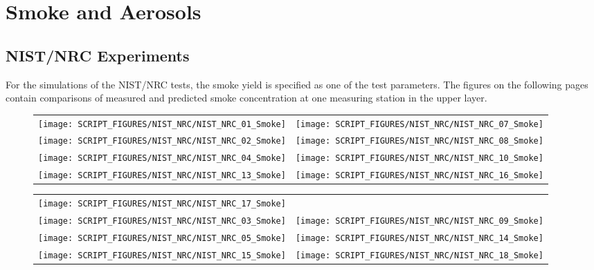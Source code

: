\clearpage


\section{Smoke and Aerosols}



\subsection{NIST/NRC Experiments}
\label{Smoke Concentration}

For the simulations of the NIST/NRC tests, the smoke yield is specified as one of the test parameters.
The figures on the following pages contain comparisons of measured and predicted smoke concentration at one measuring station in the upper layer.

\begin{figure}[p]
\begin{tabular*}{\textwidth}{l@{\extracolsep{\fill}}r}
\texttt{[image: SCRIPT\_FIGURES/NIST\_NRC/NIST\_NRC\_01\_Smoke]} &
\texttt{[image: SCRIPT\_FIGURES/NIST\_NRC/NIST\_NRC\_07\_Smoke]} \\
\texttt{[image: SCRIPT\_FIGURES/NIST\_NRC/NIST\_NRC\_02\_Smoke]} &
\texttt{[image: SCRIPT\_FIGURES/NIST\_NRC/NIST\_NRC\_08\_Smoke]} \\
\texttt{[image: SCRIPT\_FIGURES/NIST\_NRC/NIST\_NRC\_04\_Smoke]} &
\texttt{[image: SCRIPT\_FIGURES/NIST\_NRC/NIST\_NRC\_10\_Smoke]} \\
\texttt{[image: SCRIPT\_FIGURES/NIST\_NRC/NIST\_NRC\_13\_Smoke]} &
\texttt{[image: SCRIPT\_FIGURES/NIST\_NRC/NIST\_NRC\_16\_Smoke]}
\end{tabular*}
\end{figure}

\begin{figure}[p]
\begin{tabular*}{\textwidth}{l@{\extracolsep{\fill}}r}
\texttt{[image: SCRIPT\_FIGURES/NIST\_NRC/NIST\_NRC\_17\_Smoke]} &
 \\
\texttt{[image: SCRIPT\_FIGURES/NIST\_NRC/NIST\_NRC\_03\_Smoke]} &
\texttt{[image: SCRIPT\_FIGURES/NIST\_NRC/NIST\_NRC\_09\_Smoke]} \\
\texttt{[image: SCRIPT\_FIGURES/NIST\_NRC/NIST\_NRC\_05\_Smoke]} &
\texttt{[image: SCRIPT\_FIGURES/NIST\_NRC/NIST\_NRC\_14\_Smoke]} \\
\texttt{[image: SCRIPT\_FIGURES/NIST\_NRC/NIST\_NRC\_15\_Smoke]} &
\texttt{[image: SCRIPT\_FIGURES/NIST\_NRC/NIST\_NRC\_18\_Smoke]}
\end{tabular*}
\end{figure}


